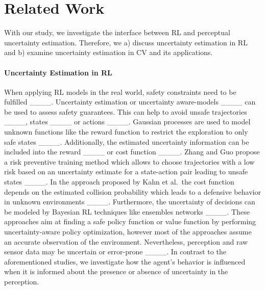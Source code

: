 \section{Related Work}
With our study, we investigate the interface between RL and perceptual uncertainty estimation. Therefore, we a) discuss uncertainty estimation in RL and b) examine uncertainty estimation in CV and its applications.

\paragraph{Uncertainty Estimation in RL}
When applying RL models in the real world, safety constraints need to be fulfilled ____. Uncertainty estimation or uncertainty aware-models ____ can be used to assess safety guarantees. 
This can help to avoid unsafe trajectories ____, states 
____ or actions 
____. Gaussian processes are used to model unknown functions like the reward function to restrict the exploration to only safe states ____. 
Additionally, the estimated uncertainty information can be included into the reward ____ or cost function ____. 
Zhang and Guo propose a risk preventive training method which allows to choose trajectories with a low risk based on an uncertainty estimate for a state-action pair leading to unsafe states ____. In the approach proposed by Kahn et al.\ the cost function depends on the estimated collision probability which leads to a defensive behavior in unknown environments ____.
Furthermore, the uncertainty of decisions can be modeled by Bayesian RL techniques like ensembles networks ____.
These approaches aim at finding a safe policy function or value function by performing uncertainty-aware policy optimization, however most of the approaches assume an accurate observation of the environment.
Nevertheless, perception and raw sensor data may be uncertain or error-prone ____.
In contrast to the aforementioned studies, we investigate how the agent's behavior is influenced when it is informed about the presence or absence of uncertainty in the perception.

